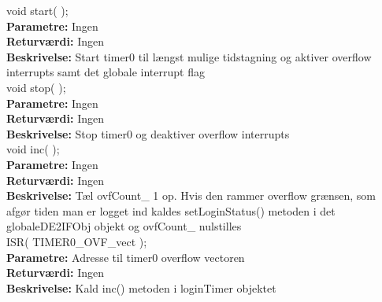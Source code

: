 void start( ); \\
\textbf{Parametre:} Ingen \\
\textbf{Returværdi:} Ingen \\
\textbf{Beskrivelse:} Start timer0 til længst mulige tidstagning og aktiver overflow interrupts samt det globale interrupt flag \\

void stop( ); \\
\textbf{Parametre:} Ingen \\
\textbf{Returværdi:} Ingen \\
\textbf{Beskrivelse:} Stop timer0 og deaktiver overflow interrupts \\

void inc( ); \\
\textbf{Parametre:} Ingen \\
\textbf{Returværdi:} Ingen \\
\textbf{Beskrivelse:} Tæl ovfCount\_ 1 op. Hvis den rammer overflow grænsen, som afgør tiden man er logget ind kaldes setLoginStatus() metoden i det globaleDE2IFObj objekt og ovfCount\_ nulstilles  \\

ISR( TIMER0\_OVF\_vect ); \\
\textbf{Parametre:} Adresse til timer0 overflow vectoren \\
\textbf{Returværdi:} Ingen \\
\textbf{Beskrivelse:} Kald inc() metoden i loginTimer objektet \\




